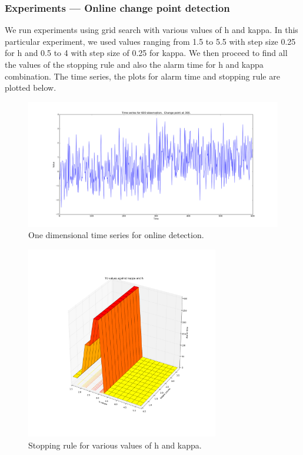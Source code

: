 \documentclass{article}
\begin{document}
\subsubsection{Experiments --- Online change point detection}

We run experiments using grid search with various values of h and kappa.  In this particular experiment, we used values ranging from 1.5 to 5.5 with step size 0.25 for h and 0.5 to 4 with step size of 0.25 for kappa.  We then proceed to find all the values of the stopping rule and also the alarm time for h and kappa combination.  The time series, the plots for alarm time and stopping rule are plotted below.

\begin{figure}[ht!]
  \centering
  \includegraphics[width=1\textwidth]{images/1d_online/ts}
  \caption{One dimensional time series for online detection.\label{fig:1d_o_ts}}
\end{figure}

\begin{figure}[ht!]
  \centering
  \includegraphics[width=0.75\textwidth]{images/1d_online/time}
  \caption{Stopping rule for various values of h and kappa.\label{fig:1d_o_time}}
\end{figure}
\end{document}
